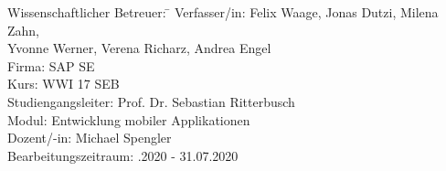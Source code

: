\begin{titlepage}
\begin{center}
\begin{minipage}{\textwidth}
\begin{tabbing}
	Wissenschaftlicher Betreuer: \hspace{0.85cm}\=\kill
	Verfasser/in: \> Felix Waage, Jonas Dutzi, Milena Zahn, \\ \> Yvonne Werner, Verena Richarz, Andrea Engel \\[1.5mm]
	Firma: \> SAP SE \\[1.5mm]
	Kurs: \> WWI 17 SEB\\[1.5mm]
	Studiengangsleiter: \> Prof. Dr. Sebastian Ritterbusch  \\[1.5mm]
	Modul: \> Entwicklung mobiler Applikationen \\[1.5mm]
	Dozent/-in: \> Michael Spengler \\[1.5mm]
	Bearbeitungszeitraum: .2020 - 31.07.2020
	
\end{tabbing}
\end{minipage}

\end{center}

\end{titlepage}